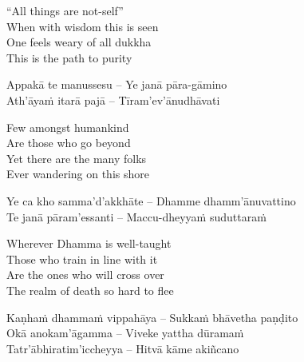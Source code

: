 \begin{english-verses}
  ``All things are not-self''\ifdigitalversion\makeatletter\hyperlink{endnote36-appendix}\makeatother\fi\\

  When with wisdom this is seen\\
  One feels weary of all dukkha\\
  This is the path to purity
\end{english-verses}

\suttaRef{[Dhp 277-279]}

\begin{verses}
  Appakā te manussesu – Ye janā pāra-gāmino\\
  Ath'āyaṁ itarā pajā – Tīram'ev'ānudhāvati
\end{verses}

\begin{english-verses}
  Few amongst humankind\\
  Are those who go beyond\\
  Yet there are the many folks\\
  Ever wandering on this shore
\end{english-verses}

\begin{verses}
  Ye ca kho samma'd'akkhāte – Dhamme dhamm'ānuvattino\\
  Te janā pāram'essanti – Maccu-dheyyaṁ suduttaraṁ\\
\end{verses}

\begin{english-verses}
  Wherever Dhamma is well-taught\\
  Those who train in line with it\\
  Are the ones who will cross over\\
  The realm of death so hard to flee
\end{english-verses}

\begin{verses}
  Kaṇhaṁ dhammaṁ vippahāya – Sukkaṁ bhāvetha paṇḍito\\
  Okā anokam'āgamma – Viveke yattha dūramaṁ\\
  Tatr'ābhiratim'iccheyya – Hitvā kāme akiñcano
\end{verses}

